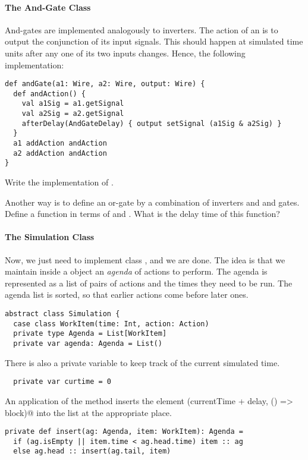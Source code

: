 {\paragraph{The And-Gate Class}
And-gates are implemented analogously to inverters.  The action of an
 is to output the conjunction of its input signals.
This should happen at  simulated time units after
any one of its two inputs changes. Hence, the following implementation:
\begin{lstlisting}
def andGate(a1: Wire, a2: Wire, output: Wire) {
  def andAction() {
    val a1Sig = a1.getSignal
    val a2Sig = a2.getSignal
    afterDelay(AndGateDelay) { output setSignal (a1Sig & a2Sig) }
  }
  a1 addAction andAction
  a2 addAction andAction
}
\end{lstlisting}

\begin{exercise} Write the implementation of .
\end{exercise}

\begin{exercise} Another way is to define an or-gate by a combination of
inverters and and gates. Define a function  in terms of
 and . What is the delay time of this function?
\end{exercise}

\paragraph{The Simulation Class}

Now, we just need to implement class , and we are
done.  The idea is that we maintain inside a  object
an \emph{agenda} of actions to perform.  The agenda is represented as
a list of pairs of actions and the times they need to be run.  The
agenda list is sorted, so that earlier actions come before later ones.
\begin{lstlisting} 
abstract class Simulation {
  case class WorkItem(time: Int, action: Action)
  private type Agenda = List[WorkItem]
  private var agenda: Agenda = List()
\end{lstlisting}
There is also a private variable  to keep track of the
current simulated time.
\begin{lstlisting}
  private var curtime = 0
\end{lstlisting}
An application of the method  
inserts the element \lstinline@WorkItem(currentTime + delay, () => block)@
into the  list at the appropriate place.
\begin{lstlisting}
private def insert(ag: Agenda, item: WorkItem): Agenda =
  if (ag.isEmpty || item.time < ag.head.time) item :: ag
  else ag.head :: insert(ag.tail, item)


\end{lstlisting}}
